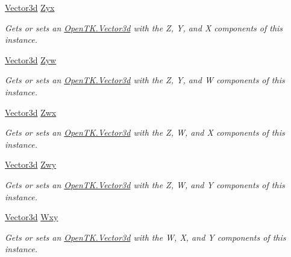 \begin{DoxyCompactItemize}
\hyperlink{struct_open_t_k_1_1_vector3d}{Vector3d} \hyperlink{struct_open_t_k_1_1_vector4d_af2ae726ea271da2fb92774de5514ef10}{Zyx}
\begin{DoxyCompactList}\small\item\em Gets or sets an \hyperlink{struct_open_t_k_1_1_vector3d}{Open\-T\-K.\-Vector3d} with the Z, Y, and X components of this instance. \end{DoxyCompactList}\item 
\hyperlink{struct_open_t_k_1_1_vector3d}{Vector3d} \hyperlink{struct_open_t_k_1_1_vector4d_a34fcf5a1437f2112426b3d5c5e2f55e8}{Zyw}
\begin{DoxyCompactList}\small\item\em Gets or sets an \hyperlink{struct_open_t_k_1_1_vector3d}{Open\-T\-K.\-Vector3d} with the Z, Y, and W components of this instance. \end{DoxyCompactList}\item 
\hyperlink{struct_open_t_k_1_1_vector3d}{Vector3d} \hyperlink{struct_open_t_k_1_1_vector4d_a78309dc07b0dd112b59dbee1127f795c}{Zwx}
\begin{DoxyCompactList}\small\item\em Gets or sets an \hyperlink{struct_open_t_k_1_1_vector3d}{Open\-T\-K.\-Vector3d} with the Z, W, and X components of this instance. \end{DoxyCompactList}\item 
\hyperlink{struct_open_t_k_1_1_vector3d}{Vector3d} \hyperlink{struct_open_t_k_1_1_vector4d_ac126676649f22dcc8fa0167a41450c4f}{Zwy}
\begin{DoxyCompactList}\small\item\em Gets or sets an \hyperlink{struct_open_t_k_1_1_vector3d}{Open\-T\-K.\-Vector3d} with the Z, W, and Y components of this instance. \end{DoxyCompactList}\item 
\hyperlink{struct_open_t_k_1_1_vector3d}{Vector3d} \hyperlink{struct_open_t_k_1_1_vector4d_addb3d11762322adf2c943c04ead56c8c}{Wxy}
\begin{DoxyCompactList}\small\item\em Gets or sets an \hyperlink{struct_open_t_k_1_1_vector3d}{Open\-T\-K.\-Vector3d} with the W, X, and Y components of this instance. \end{DoxyCompactList}\item 

\end{DoxyCompactItemize}
